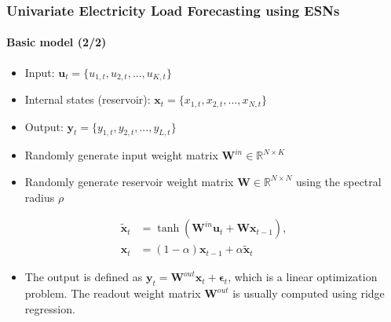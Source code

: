 \documentclass[aspectratio=169]{beamer}
\begin{document}
\begin{frame}
\frametitle{Univariate Electricity Load Forecasting using ESNs}
\framesubtitle{\large Basic model (2/2)}

\begin{itemize}
\item Input: $\mathbf{u}_t = \{ u_{1,t}, u_{2,t},...,u_{K,t} \}$
\item Internal states (reservoir): $\mathbf{x}_t = \{ x_{1,t}, x_{2,t},...,x_{N,t} \}$
\item Output: $\mathbf{y}_t = \{ y_{1,t}, y_{2,t},...,y_{L,t} \}$
\end{itemize}

\begin{itemize}
\item Randomly generate input weight matrix $\mathbf{W}^{in} \in \mathbb{R}^{N \times K}$
\item Randomly generate reservoir weight matrix $\mathbf{W} \in \mathbb{R}^{N \times N}$ using the spectral radius $\rho$
\end{itemize}

\begin{subequations}
\begin{align}
\mathbf{\widetilde{x}}_{t} &= \tanh \left( {\mathbf{W}^{in}} \mathbf{u}_{t} + \mathbf{W}\mathbf{x}_{t - 1} \right), \label{eq:update} \\
\mathbf{x}_{t} &= (1 - \alpha )\mathbf{x}_{t - 1} + \alpha \mathbf{\widetilde{x}}_{t} \label{eq:states}
\end{align}
\end{subequations}


\begin{itemize}
\item The output is defined as $\mathbf{y}_{t} = \mathbf{W}^{out} \mathbf{x}_{t} + \boldsymbol{\epsilon}_{t}$, which is a linear optimization problem. The readout weight matrix $\mathbf{W}^{out}$ is usually computed using ridge regression.
\end{itemize}

\end{frame}
\end{document}
